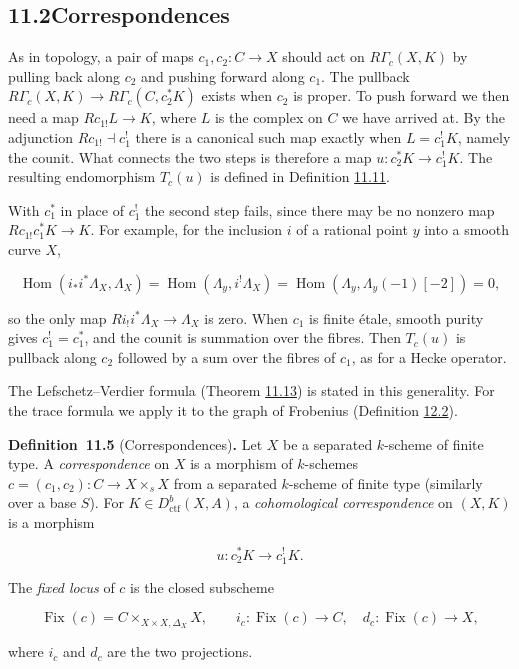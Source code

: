 \documentclass[11pt]{article}
\newenvironment{bpstatement}[2]{\par\addvspace{0.6\baselineskip}\noindent\textbf{#1}#2\textbf{.}\enspace\ignorespaces}
  {\par\addvspace{0.4\baselineskip}}
\providecommand{\Fix}{}\renewcommand{\Fix}{\operatorname{Fix}}
\begin{document}
\subsection*{\texorpdfstring{11.2\quad Correspondences}{11.2 Correspondences}}
\label{bp182}%
\label{bp183}%
As in topology, a pair of maps \(c_1,c_2:C\to X\) should act on \(R\Gamma_c(X,K)\) by pulling back along \(c_2\) and pushing forward along \(c_1\). The pullback \(R\Gamma_c(X,K)\to R\Gamma_c(C,c_2^*K)\) exists when \(c_2\) is proper. To push forward we then need a map \(Rc_{1!}L\to K\), where \(L\) is the complex on \(C\) we have arrived at. By the adjunction \(Rc_{1!}\dashv c_1^!\) there is a canonical such map exactly when \(L=c_1^!K\), namely the counit. What connects the two steps is therefore a map \(u:c_2^*K\to c_1^!K\). The resulting endomorphism \(T_c(u)\) is defined in Definition \hyperref[bp202]{11.11}.

With \(c_1^*\) in place of \(c_1^!\) the second step fails, since there may be no nonzero map \(Rc_{1!}c_1^*K\to K\). For example, for the inclusion \(i\) of a rational point \(y\) into a smooth curve \(X\),

\[
\operatorname{Hom}(i_*i^*\Lambda_X,\Lambda_X)
=\operatorname{Hom}(\Lambda_y,i^!\Lambda_X)
=\operatorname{Hom}(\Lambda_y,\Lambda_y(-1)[-2])=0,
\]

so the only map \(Ri_!i^*\Lambda_X\to\Lambda_X\) is zero. When \(c_1\) is finite étale, smooth purity gives \(c_1^!=c_1^*\), and the counit is summation over the fibres. Then \(T_c(u)\) is pullback along \(c_2\) followed by a sum over the fibres of \(c_1\), as for a Hecke operator.

The Lefschetz–Verdier formula (Theorem \hyperref[bp206]{11.13}) is stated in this generality. For the trace formula we apply it to the graph of Frobenius (Definition \hyperref[bp232]{12.2}).

\label{bp184}%
\begin{bpstatement}{Definition~11.5}{ (Correspondences)}
Let \(X\) be a separated \(k\)-scheme of finite type. A \emph{correspondence} on \(X\) is a morphism of \(k\)-schemes \(c=(c_1,c_2):C\to X\times_sX\) from a separated \(k\)-scheme of finite type (similarly over a base \(S\)). For \(K\in D^b_{\mathrm{ctf}}(X,A)\), a \emph{cohomological correspondence} on \((X,K)\) is a morphism

\[
u:c_2^*K\longrightarrow c_1^!K.
\]

The \emph{fixed locus} of \(c\) is the closed subscheme

\[
\Fix(c)=C\times_{X\times X,\Delta_X}X,
\qquad i_c:\Fix(c)\longrightarrow C,\quad d_c:\Fix(c)\longrightarrow X,
\]

where \(i_c\) and \(d_c\) are the two projections.
\end{bpstatement}
\end{document}
